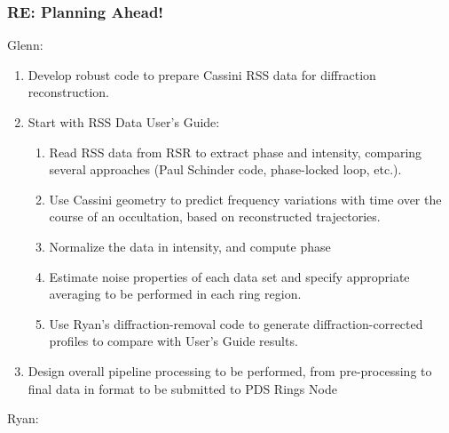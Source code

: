 \documentclass[crop=false,class=article,oneside]{standalone}
\begin{document}
        \subsubsection{RE: Planning Ahead!}
            Glenn:
            \begin{enumerate}
                \item Develop robust code to prepare Cassini RSS
                      data for diffraction reconstruction.
                \item Start with RSS Data User's Guide:
                \begin{enumerate}
                    \item Read RSS data from RSR to extract phase and
                          intensity, comparing several approaches
                          (Paul Schinder code, phase-locked loop, etc.).
                    \item Use Cassini geometry to predict frequency
                          variations with time over the course of an
                          occultation, based on reconstructed
                          trajectories.
                    \item Normalize the data in intensity,
                          and compute phase
                    \item Estimate noise properties of each data set
                          and specify appropriate averaging to be
                          performed in each ring region.
                    \item Use Ryan's diffraction-removal code to
                          generate diffraction-corrected profiles to
                          compare with User's Guide results.
                \end{enumerate}
                \item Design overall pipeline processing to be performed,
                      from pre-processing to final data in format
                      to be submitted to PDS Rings Node
            \end{enumerate}
            Ryan:
\end{document}
